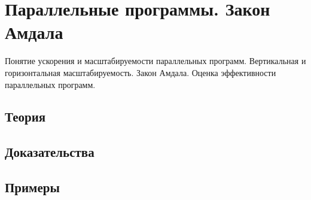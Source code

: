 
\section{Параллельные программы. Закон Амдала}
\label{sec:1.3.10-parallel-amdahl}

\begin{ticket}
Понятие ускорения и масштабируемости параллельных программ. Вертикальная и горизонтальная масштабируемость. Закон Амдала. Оценка эффективности параллельных программ.
\end{ticket}

\subsection*{Теория}

\subsection*{Доказательства}

\subsection*{Примеры}

